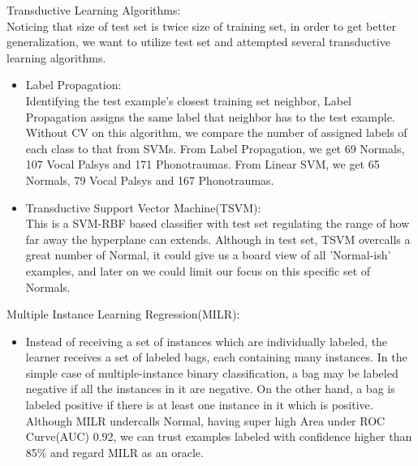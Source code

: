 Transductive Learning Algorithms:\newline\\
\indent Noticing that size of test set is twice size of training set, in order to get better generalization, we want to utilize test set and attempted several transductive learning algorithms. \\
\begin{itemize}
	\item Label Propagation:\\
	Identifying the test example's closest training set neighbor, Label Propagation assigns the same label that neighbor has to the test example. Without CV on this algorithm, we compare the number of assigned labels of each class to that from SVMs. From Label Propagation, we get 69 Normals, 107 Vocal Palsys and 171 Phonotraumas. From Linear SVM, we get 65 Normals, 79 Vocal Palsys and 167 Phonotraumas.
	\item Transductive Support Vector Machine(TSVM):\\
	This is a SVM-RBF based classifier with test set regulating the range of how far away the hyperplane can extends. Although in test set, TSVM overcalls a great number of Normal, it could give us a board view of all 'Normal-ish' examples, and later on we could limit our focus on this specific set of Normals. \\
\end{itemize}

Multiple Instance Learning Regression(MILR):
\begin{itemize}
	\item 
	Instead of receiving a set of instances which are individually labeled, the learner receives a set of labeled bags, each containing many instances. In the simple case of multiple-instance binary classification, a bag may be labeled negative if all the instances in it are negative. On the other hand, a bag is labeled positive if there is at least one instance in it which is positive. \cite{b10} Although MILR undercalls Normal, having super high Area under ROC Curve(AUC) 0.92, we can trust examples labeled with confidence higher than 85\% and regard MILR as an oracle.
\end{itemize}
